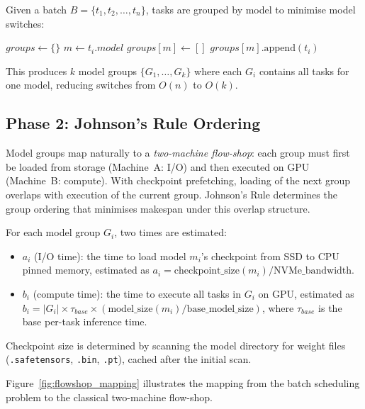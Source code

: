 \documentclass[logo,bsc,singlespacing,parskip,online]{infthesis}
\begin{document}
Given a batch $B = \{t_1, t_2, \ldots, t_n\}$, tasks are grouped by model to minimise model switches:

\begin{algorithmic}
\STATE $groups \gets \{\}$
  \STATE $m \gets t_i.model$
    \STATE $groups[m] \gets []$
  \ENDIF
  \STATE $groups[m].\text{append}(t_i)$
\ENDFOR
\end{algorithmic}

This produces $k$ model groups $\{G_1, \ldots, G_k\}$ where each $G_i$ contains all tasks for one model, reducing switches from $O(n)$ to $O(k)$.

\subsection{Phase 2: Johnson's Rule Ordering}
\label{sec:johnsons_rule}

Model groups map naturally to a \textit{two-machine flow-shop}: each group must first be loaded from storage (Machine~A: I/O) and then executed on GPU (Machine~B: compute). With checkpoint prefetching, loading of the next group overlaps with execution of the current group. Johnson's Rule determines the group ordering that minimises makespan under this overlap structure.

For each model group $G_i$, two times are estimated:
\begin{itemize}
\item $a_i$ (I/O time): the time to load model $m_i$'s checkpoint from SSD to CPU pinned memory, estimated as $a_i = \text{checkpoint\_size}(m_i) / \text{NVMe\_bandwidth}$.
\item $b_i$ (compute time): the time to execute all tasks in $G_i$ on GPU, estimated as $b_i = |G_i| \times \tau_{base} \times (\text{model\_size}(m_i) / \text{base\_model\_size})$, where $\tau_{base}$ is the base per-task inference time.
\end{itemize}

Checkpoint size is determined by scanning the model directory for weight files (\texttt{.safetensors}, \texttt{.bin}, \texttt{.pt}), cached after the initial scan.

Figure~\ref{fig:flowshop_mapping} illustrates the mapping from the batch scheduling problem to the classical two-machine flow-shop.
\end{document}
